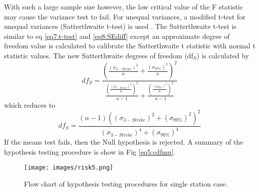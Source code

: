 With such a large sample size however, the low critical value of the F statistic may cause the variance test to fail. For unequal variances, a modified t-test for unequal variances (Satterthwaite t-test) is used \citep{Ruxton2006}.  The Satterthwaite t-test is similar to eq \ref{eq7:t-test} and \ref{eq8:SEdiff} except an approximate degree of freedom value is calculated to calibrate the Satterthwaite t statistic with normal t statistic values. The new Satterthwaite degrees of freedom (df$_{S}$) is calculated by
%
\begin{equation}
\label{eq9:sath_dfs}
df_{S} = \frac{\left(\frac{(\sigma_{3-Strike})^{2}}{n}+\frac{(\sigma_{99\%})^{2}}{n}\right)^{2}}{ \frac{\left(\frac{(\sigma_{3-Strike})^{2}}{n}\right )^{2}}{n-1}+\frac{\left(\frac{(\sigma_{99\%})^{2}}{n}\right )^{2}}{n-1}}
\end{equation}
%
\noindent
which reduces to
%
\begin{equation}
\label{eq10:sath_dfs_reduce}
df_{S} = \frac{(n-1)\left ((\sigma_{3-Strike})^{2}+(\sigma_{99\%})^{2}\right )^{2}}{(\sigma_{3-Strike})^{4}+(\sigma_{99\%})^{4}}
\end{equation}
%
If the means test fails, then the Null hypothesis is rejected.  A summary of the hypothesis testing procedure is show in Fig \ref{eq5:cdfmu}.
%  
\begin{figure}[H]
\centering
\texttt{[image: images/risk5.png]} 
\caption{Flow chart of hypothesis testing procedures for single station case.}
\label{fig5:flowchart}
\end{figure}
%
